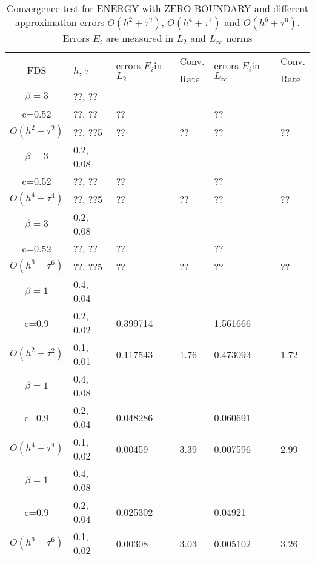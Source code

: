 \documentclass{article}
\begin{document}
\begin{table}[ht]
\centering
\small
		\begin{tabular}{||c|l|ll|ll||}
			\hline
			\hline
      \multirow{2  }{*}{FDS}        & \multirow{2  }{*}{$h$, $\tau$}  & \multirow{2  }{*}{errors $E_i$in$L_2$}  &Conv.& \multirow{2  }{*}{errors $E_i$in$L_\infty$}  &Conv.  \\
	         &                    &                               & Rate   &                                        & Rate \\
   			\hline 
					\hline 
  $\beta=3$       &??, ??   &            &        &                  &      \\
      c=0.52   &??, ??   &?? &           &??      &       \\
     $O(h^2 + \tau^ 2)$ &??, ??5 &?? &??  &?? & ??       \\
			\hline 
   $\beta=3$        &0.2, 0.08   &            &        &                  &      \\
   c=0.52  &??, ??   &?? &           &??      &       \\
     $O(h^4+ \tau^4)$ &??, ??5 &?? &??  &?? & ??       \\
			\hline 
  $\beta=3$               &0.2, 0.08   &            &        &                  &      \\
   c=0.52                  &??, ??   &?? &           &??      &       \\
     $O(h^6+ \tau^6)$ &??, ??5 &?? &??  &?? & ??       \\
	   \hline
			\hline 
       $\beta=1$       &0.4, 0.04        &             &            &           &   \\
                  c=0.9    &0.2, 0.02       & 0.399714   &            &1.561666 &   \\
  $O(h^2+ \tau^2)$ &0.1, 0.01   &0.117543  &1.76  &0.473093  & 1.72 \\
			\hline
      $\beta=1$             &0.4, 0.08     &            &            &             &    \\
       c=0.9                   &0.2, 0.04      & 0.048286   &       &  0.060691  &   \\
       $O(h^4+ \tau^4)$ &0.1, 0.02   & 0.00459& 3.39    &0.007596  & 2.99  \\
    \hline
  $\beta=1$     &0.4, 0.08   &                      &           &                   &      \\
      c=0.9    &0.2, 0.04        & 0.025302     &           & 0.04921     &       \\
     $O(h^6+ \tau^6)$         &  0.1, 0.02    & 0.00308 & 3.03  &0.005102 & 3.26        \\
	   \hline
			\hline 
		\end{tabular}
		\caption{Convergence test for ENERGY with ZERO BOUNDARY and different approximation errors $O(h^{2} + \tau^2 )$, $O(h^{4} + \tau^4 )$ and $O(h^{6} + \tau^6 )$. Errors $E_i$ are measured in $L_2$ and $L_\infty$ norms}
\label{tableB}
\end{table}
\end{document}
